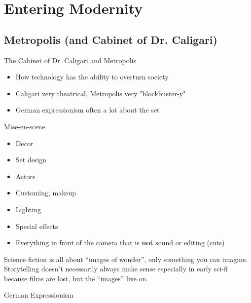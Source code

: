 \documentclass[11pt,fleqn]{book} %
\begin{document}
\section{Entering Modernity}
\subsection{Metropolis (and Cabinet of Dr. Caligari)}
\begin{descriptions}
    \item[The Cabinet of Dr. Caligari and Metropolis]
    \begin{descriptions}
    \end{descriptions}
    \begin{itemize}
        \item How technology has the ability to overturn society
        \item Caligari very theatrical, Metropolis very "blockbuster-y"
        \item German expressionism often a lot about the set
    \end{itemize}
    \item[Mise-en-scene]
    \begin{descriptions}
    \end{descriptions}
    \begin{itemize}
        \item Decor
        \item Set design
        \item Actors
        \item Customing, makeup
        \item Lighting
        \item Special effects
        \item Everything in front of the camera that is \textbf{not} sound or editing (cuts)
    \end{itemize}
    \begin{remark}
        Science fiction is all about \enquote{images of wonder}, only something you can imagine.\\
        Storytelling doesn't necessarily always make sense especially in early sci-fi because films are lost, but the \enquote{images} live on.
    \end{remark}
    \item[German Expressionism]
    \begin{descriptions}
    \end{descriptions}
    \begin{itemize}

\end{itemize}
\end{descriptions}
\end{document}
